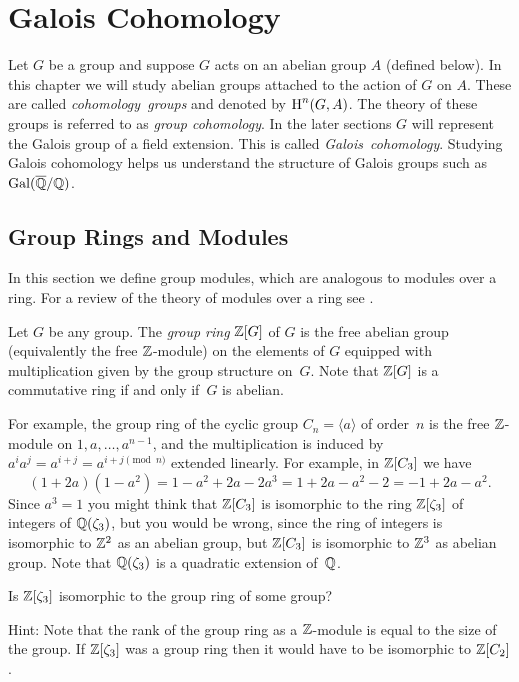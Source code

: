 \chapter{Galois Cohomology}\label{ch:gc}

Let $G$ be a group and suppose $G$ acts on an abelian group $A$
(defined below). In this chapter we will study abelian groups attached
to the action of $G$ on $A$. These are called \emph{cohomology~groups}
and denoted by $\operatorname{H}^n(G,A)$. The theory of these groups is referred
to as \emph{group cohomology}. In the later sections $G$ will represent
the Galois group of a field extension. This is called
\emph{Galois~cohomology}. Studying Galois cohomology helps us
understand the structure of Galois groups such as $\operatorname{Gal}(\overline{\mathbb{Q}}/\mathbb{Q})$.

\section{Group Rings and Modules}

In this section we define group modules, which are analogous
to modules over a ring. For a review of the theory of modules
over a ring see \cite[Ch.~10]{dummit2004abstract}.

\begin{definition}\label{def:groupring}
	Let $G$ be any group. The \emph{group ring} $\mathbb{Z}[G]$ of $G$
	is the free abelian group (equivalently the free $\mathbb{Z}$-module) on the elements of $G$ equipped
	with multiplication given by the group structure on~$G$.
	Note that $\mathbb{Z}[G]$ is a commutative ring if and only if~$G$ is
	abelian.
\end{definition}

\begin{example}
	For example, the group ring of the cyclic group
	$C_n=\langle a\rangle$ of order~$n$ is
	the free $\mathbb{Z}$-module on $1,a,\ldots, a^{n-1}$, and the multiplication
	is induced by $a^i a^j = a^{i+j} = a^{i + j \pmod{n}}$ extended
	linearly. For example, in  $\mathbb{Z}[C_3]$ we have
	$$
	(1 + 2 a)(1 - a^2) = 1 - a^2 + 2a - 2 a^3
	= 1 + 2a - a^2 - 2 = -1 + 2a - a^2.
	$$
	Since $a^3 = 1$
	you might think that $\mathbb{Z}[C_3]$ is isomorphic to the ring $\mathbb{Z}[\zeta_3]$
	of integers of $\mathbb{Q}(\zeta_3)$, but you would be wrong, since the ring
	of integers is isomorphic to $\mathbb{Z}^2$ as an abelian group, but $\mathbb{Z}[C_3]$
	is isomorphic to $\mathbb{Z}^3$ as abelian group. Note that $\mathbb{Q}(\zeta_3)$
	is a quadratic extension of~$\mathbb{Q}$.
\end{example}

\begin{exercise}
	Is $\mathbb{Z}[\zeta_3]$ isomorphic to the group ring of some group?
	
	Hint: Note that the rank of the group ring as a
	$\mathbb{Z}$-module is equal to the size of the group.
	If $\mathbb{Z}[\zeta_3]$ was a group ring then it would
	have to be isomorphic to $\mathbb{Z}[C_2]$.
\end{exercise}

